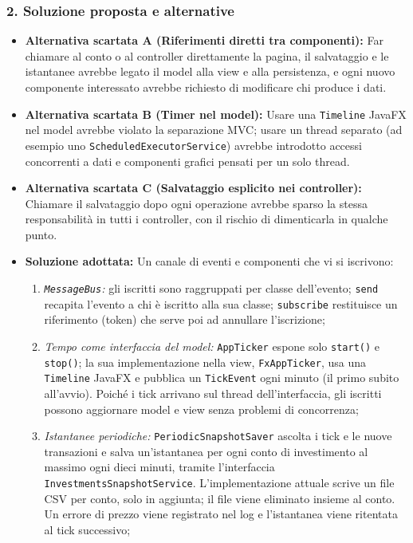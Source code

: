 \documentclass[11pt,a4paper,openright]{report}
\begin{document}
\subsubsection*{2. Soluzione proposta e alternative}
\begin{itemize}
    \item \textbf{Alternativa scartata A (Riferimenti diretti tra componenti):} Far chiamare al conto o al controller direttamente la pagina, il salvataggio e le istantanee avrebbe legato il model alla view e alla persistenza, e ogni nuovo componente interessato avrebbe richiesto di modificare chi produce i dati.
    \item \textbf{Alternativa scartata B (Timer nel model):} Usare una \texttt{Timeline} JavaFX nel model avrebbe violato la separazione MVC; usare un thread separato (ad esempio uno \texttt{ScheduledExecutorService}) avrebbe introdotto accessi concorrenti a dati e componenti grafici pensati per un solo thread.
    \item \textbf{Alternativa scartata C (Salvataggio esplicito nei controller):} Chiamare il salvataggio dopo ogni operazione avrebbe sparso la stessa responsabilità in tutti i controller, con il rischio di dimenticarla in qualche punto.
    \item \textbf{Soluzione adottata:} Un canale di eventi e componenti che vi si iscrivono:
    \begin{enumerate}
        \item \emph{\texttt{MessageBus}:} gli iscritti sono raggruppati per classe dell'evento; \texttt{send} recapita l'evento a chi è iscritto alla sua classe; \texttt{subscribe} restituisce un riferimento (token) che serve poi ad annullare l'iscrizione;
        \item \emph{Tempo come interfaccia del model:} \texttt{AppTicker} espone solo \texttt{start()} e \texttt{stop()}; la sua implementazione nella view, \texttt{FxAppTicker}, usa una \texttt{Timeline} JavaFX e pubblica un \texttt{TickEvent} ogni minuto (il primo subito all'avvio). Poiché i tick arrivano sul thread dell'interfaccia, gli iscritti possono aggiornare model e view senza problemi di concorrenza;
        \item \emph{Istantanee periodiche:} \texttt{PeriodicSnapshotSaver} ascolta i tick e le nuove transazioni e salva un'istantanea per ogni conto di investimento al massimo ogni dieci minuti, tramite l'interfaccia \texttt{InvestmentsSnapshotService}. L'implementazione attuale scrive un file CSV per conto, solo in aggiunta; il file viene eliminato insieme al conto. Un errore di prezzo viene registrato nel log e l'istantanea viene ritentata al tick successivo;

\end{enumerate}
\end{itemize}
\end{document}
